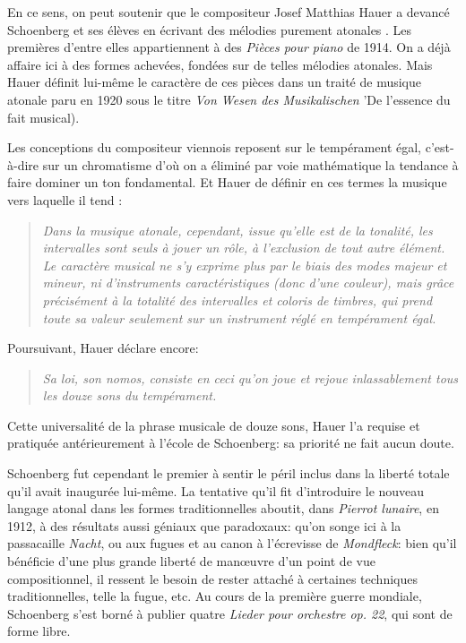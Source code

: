 \documentclass[11pt,a4paper]{scrreprt}
\begin{document}
En ce sens, on peut soutenir que le compositeur Josef Matthias Hauer a devancé Schoenberg et ses élèves en écrivant des mélodies \og{} purement atonales \fg{}. Les premières d'entre elles appartiennent à des \emph{Pièces pour piano} de 1914. On a déjà affaire ici à des formes achevées, fondées sur de telles mélodies atonales. Mais Hauer définit lui-même le caractère de ces pièces dans un traité de musique atonale paru en 1920 sous le titre \emph{Von Wesen des Musikalischen} 'De l'essence du fait musical).

Les conceptions du compositeur viennois reposent sur le tempérament égal, c'est-à-dire sur un chromatisme d'où on a éliminé par voie mathématique la tendance à faire dominer un ton fondamental. Et Hauer de définir en ces termes la musique vers laquelle il tend :
\begin{quote}
\emph{Dans la musique atonale, cependant, issue qu'elle est de la tonalité, les intervalles sont seuls à jouer un rôle, à l'exclusion de tout autre élément. Le caractère musical ne s'y exprime plus par le biais des modes majeur et mineur, ni d'instruments caractéristiques (donc d'une couleur), mais grâce précisément à la \emph{totalité} des intervalles et coloris de timbres, qui prend toute sa valeur seulement sur un instrument réglé en tempérament égal.}
\end{quote}

Poursuivant, Hauer déclare encore:
\begin{quote}
\emph{Sa loi, son nomos, consiste en ceci qu'on joue et rejoue inlassablement \emph{tous} les douze sons du tempérament.}
\end{quote}
Cette universalité de la phrase musicale de douze sons, Hauer l'a requise et pratiquée antérieurement à l'école de Schoenberg: sa priorité ne fait aucun doute.

Schoenberg fut cependant le premier à sentir le péril inclus dans la liberté totale qu'il avait inaugurée lui-même. La tentative qu'il fit d'introduire le nouveau langage atonal dans les formes traditionnelles aboutit, dans \emph{Pierrot lunaire}, en 1912, à des résultats aussi géniaux que paradoxaux: qu'on songe ici à la passacaille \emph{Nacht}, ou aux fugues et au canon à l'écrevisse de \emph{Mondfleck}: bien qu'il bénéficie d'une plus grande liberté de man\oe{}uvre d'un point de vue compositionnel, il ressent le besoin de rester attaché à certaines techniques traditionnelles, telle la fugue, etc. Au cours de la première guerre mondiale, Schoenberg s'est borné à publier quatre \emph{Lieder pour orchestre op. 22}, qui sont de forme libre.
\end{document}
